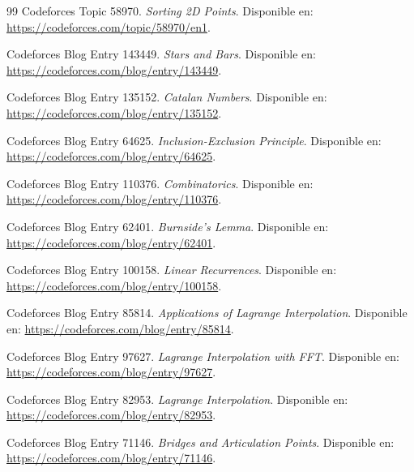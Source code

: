 \begin{thebibliography}{99}
Codeforces Topic 58970. \textit{Sorting 2D Points}.
Disponible en: \url{https://codeforces.com/topic/58970/en1}.

Codeforces Blog Entry 143449. \textit{Stars and Bars}.
Disponible en: \url{https://codeforces.com/blog/entry/143449}.

Codeforces Blog Entry 135152. \textit{Catalan Numbers}.
Disponible en: \url{https://codeforces.com/blog/entry/135152}.

Codeforces Blog Entry 64625. \textit{Inclusion-Exclusion Principle}.
Disponible en: \url{https://codeforces.com/blog/entry/64625}.

Codeforces Blog Entry 110376. \textit{Combinatorics}.
Disponible en: \url{https://codeforces.com/blog/entry/110376}.

Codeforces Blog Entry 62401. \textit{Burnside's Lemma}.
Disponible en: \url{https://codeforces.com/blog/entry/62401}.

Codeforces Blog Entry 100158. \textit{Linear Recurrences}.
Disponible en: \url{https://codeforces.com/blog/entry/100158}.

Codeforces Blog Entry 85814. \textit{Applications of Lagrange Interpolation}.
Disponible en: \url{https://codeforces.com/blog/entry/85814}.

Codeforces Blog Entry 97627. \textit{Lagrange Interpolation with FFT}.
Disponible en: \url{https://codeforces.com/blog/entry/97627}.

Codeforces Blog Entry 82953. \textit{Lagrange Interpolation}.
Disponible en: \url{https://codeforces.com/blog/entry/82953}.

Codeforces Blog Entry 71146. \textit{Bridges and Articulation Points}.
Disponible en: \url{https://codeforces.com/blog/entry/71146}.

\end{thebibliography}